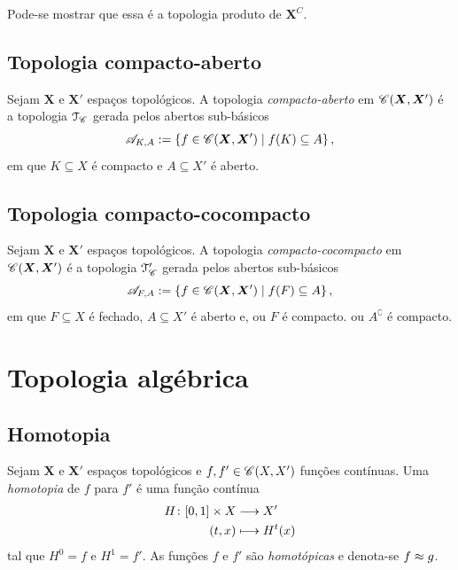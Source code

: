Pode-se mostrar que essa é a topologia produto de $\bm X^C$.


\subsection{Topologia compacto-aberto}

\begin{definition}
Sejam $\bm X$ e $\bm X'$ espaços topológicos. A topologia \emph{compacto-aberto} em $\mathscr{C}(\bm X,\bm X')$ é a topologia $\mathcal{T}_{\mathscr{C}}$ gerada pelos abertos sub-básicos
	\begin{equation*}
	\mathscr A_{K,A} := \left\{{f \in \mathscr{C}(\bm X,\bm X')}\;\middle\vert\;{f(K) \subseteq A}\right\},
	\end{equation*}
em que $K \subseteq X$ é compacto e $A \subseteq X'$ é aberto.
\end{definition}

\subsection{Topologia compacto-cocompacto}

\begin{definition}
Sejam $\bm X$ e $\bm X'$ espaços topológicos. A topologia \emph{compacto-cocompacto} em $\mathscr{C}(\bm X,\bm X')$ é a topologia $\mathcal{T}'_{\mathscr{C}}$ gerada pelos abertos sub-básicos
	\begin{equation*}
	\mathscr A_{F,A} := \left\{{f \in \mathscr{C}(\bm X,\bm X')}\;\middle\vert\;{f(F) \subseteq A}\right\},
	\end{equation*}
em que $F \subseteq X$ é fechado, $A \subseteq X'$ é aberto e, ou $F$ é compacto. ou $A^\complement$ é compacto.
\end{definition}



\section{Topologia algébrica}

\subsection{Homotopia}

\begin{definition}
Sejam $\bm X$ e $\bm X'$ espaços topológicos e $f,f' \in \mathscr{C}(X,X')$ funções contínuas. Uma \textit{homotopia} de $f$ para $f'$ é uma função contínua
	\begin{align*}
	{H}\colon {[0,1] \times X} &\longrightarrow {X'} \\{(t,x)} &\longmapsto H^t(x)
	\end{align*}
tal que $H^0 = f$ e $H^1 = f'$. As funções $f$ e $f'$ são \textit{homotópicas} e denota-se $f \approx g$.
\end{definition}

